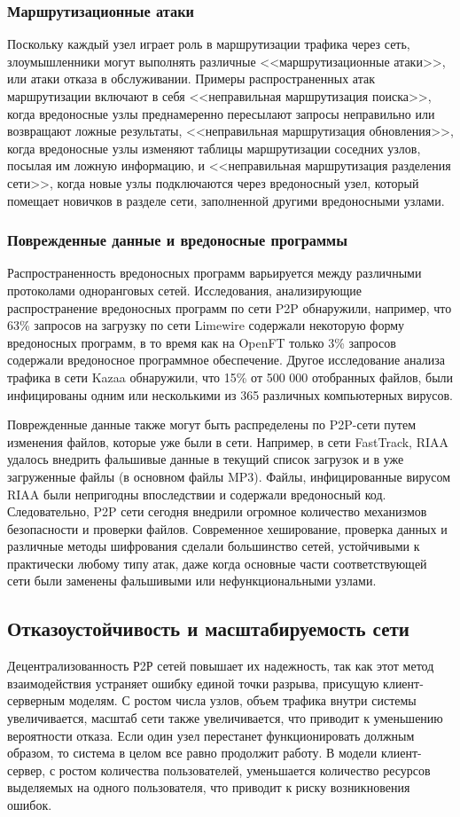\documentclass[bachelor, och, coursework]{SCWorks}
\begin{document}
\subsubsection{Маршрутизационные атаки}
Поскольку каждый узел играет роль в маршрутизации трафика через сеть, злоумышленники могут выполнять различные <<маршрутизационные атаки>>, или атаки отказа в обслуживании. Примеры распространенных атак маршрутизации включают в себя <<неправильная маршрутизация поиска>>, когда вредоносные узлы преднамеренно пересылают запросы неправильно или возвращают ложные результаты, <<неправильная маршрутизация обновления>>, когда вредоносные узлы изменяют таблицы маршрутизации соседних узлов, посылая им ложную информацию, и <<неправильная маршрутизация разделения сети>>, когда новые узлы подключаются через вредоносный узел, который помещает новичков в разделе сети, заполненной другими вредоносными узлами.

\subsubsection{Поврежденные данные и вредоносные программы}
Распространенность вредоносных программ варьируется между различными протоколами одноранговых сетей. Исследования, анализирующие распространение вредоносных программ по сети P2P обнаружили, например, что 63\% запросов на загрузку по сети Limewire содержали некоторую форму вредоносных программ, в то время как на OpenFT только 3\% запросов содержали вредоносное программное обеспечение. Другое исследование анализа трафика в сети Kazaa обнаружили, что 15\% от 500 000 отобранных файлов, были инфицированы одним или несколькими из 365 различных компьютерных вирусов.

Поврежденные данные также могут быть распределены по P2P-сети путем изменения файлов, которые уже были в сети. Например, в сети FastTrack, RIAA удалось внедрить фальшивые данные в текущий список загрузок и в уже загруженные файлы (в основном файлы MP3). Файлы, инфицированные вирусом RIAA были непригодны впоследствии и содержали вредоносный код. Следовательно, P2P сети сегодня внедрили огромное количество механизмов безопасности и проверки файлов. Современное хеширование, проверка данных и различные методы шифрования сделали большинство сетей, устойчивыми к практически любому типу атак, даже когда основные части соответствующей сети были заменены фальшивыми или нефункциональными узлами.

\subsection{Отказоустойчивость и масштабируемость сети}
Децентрализованность Р2Р сетей повышает их надежность, так как этот метод взаимодействия устраняет ошибку единой точки разрыва, присущую клиент-серверным моделям. С ростом числа узлов, объем трафика внутри системы увеличивается, масштаб сети также увеличивается, что приводит к уменьшению вероятности отказа. Если один узел перестанет функционировать должным образом, то система в целом все равно продолжит работу. В модели клиент-сервер, с ростом количества пользователей, уменьшается количество ресурсов выделяемых на одного пользователя, что приводит к риску возникновения ошибок.
\end{document}

